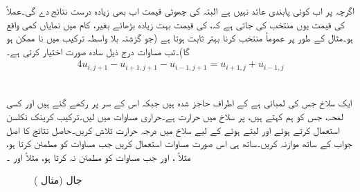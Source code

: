 اگرچہ  پر اب  کوئی پابندی عائد نہیں ہے  البتہ  کی چھوٹی قیمت اب بھی  زیادہ درست نتائج دے گی۔عملاً  کی قیمت یوں منتخب کی جاتی ہے کہ،  کی قیمت بہت زیادہ بڑھائے بغیر، کام میں نمایاں کمی واقع ہو۔مثال کے طور پر عموماً  منتخب کرنا بہتر ثابت ہوتا ہے (جو گزشتہ بلا واسطہ ترکیب میں نا ممکن ہو گا)۔تب مساوات  درج ذیل سادہ صورت اختیار کرتی ہے۔
\begin{align}\label{مساوات_اعدادی_کرینک_نکلسن_ب}
4u_{i,j+1}-u_{i+1,j+1}-u_{i-1,j+1}=u_{i+1,j}+u_{i-1,j}
\end{align}

\quad {}\\
ایک سلاخ جس کی لمبائی  ہے کے  اطراف حاجز شدہ ہیں جبکہ اس کے سر   پر رکھے گئے ہیں اور  کسی لمحہ، جس کو ہم  کہتے ہیں، پر سلاخ میں حرارت  ہے۔حراری مساوات میں  لیں۔ترکیب کرینک نکلسن استعمال کرتے ہوئے  اور  لیتے ہوئے  کے لیے سلاخ میں درجہ حرارت  تلاش کریں۔حاصل نتائج کا اصل جواب کے ساتھ موازنہ کریں۔ساتھ ہی اس صورت مساوات  استعمال کریں جب  مساوات  کو مطمئن کرتا ہو، مثلاً ، اور جب   مساوات  کو مطمئن نہ کرتا ہو، مثلاً  اور ۔
\begin{figure}
\centering
{}
\caption{جال (مثال )}
\label{شکل_مثال_اعدادی_کرینک_نکلسن}
\end{figure}

